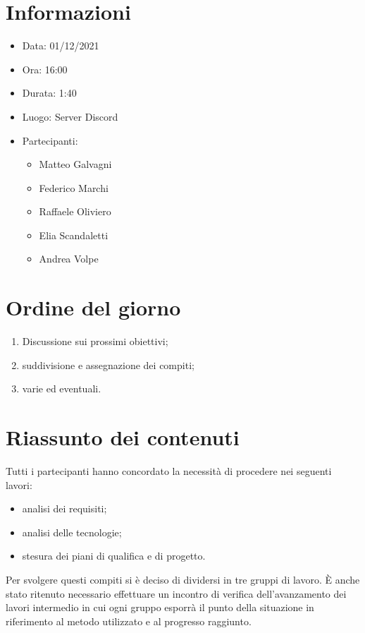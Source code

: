 \documentclass[a4paper, 12pt]{article}
\begin{document}
\makefrontpage

\section{Informazioni}

\begin{itemize}
\item Data: 01/12/2021
\item Ora: 16:00
\item Durata: 1:40
\item Luogo: Server Discord
\item Partecipanti: 
\begin{itemize}
\item Matteo Galvagni
\item Federico Marchi
\item Raffaele Oliviero
\item Elia Scandaletti
\item Andrea Volpe
\end{itemize}
\end{itemize}

\section{Ordine del giorno}
\begin{enumerate}
\item Discussione sui prossimi obiettivi;
\item suddivisione e assegnazione dei compiti;
\item varie ed eventuali.
\end{enumerate}

\section{Riassunto dei contenuti}

Tutti i partecipanti hanno concordato la necessità di procedere nei seguenti lavori:
\begin{itemize}
\item analisi dei requisiti;
\item analisi delle tecnologie;
\item stesura dei piani di qualifica e di progetto.
\end{itemize}

Per svolgere questi compiti si è deciso di dividersi in tre gruppi di lavoro.
È anche stato ritenuto necessario effettuare un incontro di verifica dell'avanzamento dei lavori intermedio in cui ogni gruppo esporrà il punto della situazione in riferimento al metodo utilizzato e al progresso raggiunto.
\end{document}
